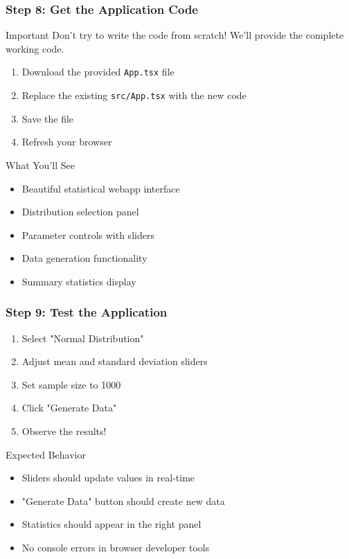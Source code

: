 \documentclass[aspectratio=169]{beamer}
\begin{document}
\begin{frame}
\frametitle{Step 8: Get the Application Code}
\begin{alertblock}{Important}
Don't try to write the code from scratch! We'll provide the complete working code.
\end{alertblock}

\begin{enumerate}
\item Download the provided \texttt{App.tsx} file
\item Replace the existing \texttt{src/App.tsx} with the new code
\item Save the file
\item Refresh your browser
\end{enumerate}

\begin{exampleblock}{What You'll See}
\begin{itemize}
\item Beautiful statistical webapp interface
\item Distribution selection panel
\item Parameter controls with sliders
\item Data generation functionality
\item Summary statistics display
\end{itemize}
\end{exampleblock}
\end{frame}

\begin{frame}[fragile]
\frametitle{Step 9: Test the Application}
\begin{enumerate}
\item Select "Normal Distribution"
\item Adjust mean and standard deviation sliders
\item Set sample size to 1000
\item Click "Generate Data"
\item Observe the results!
\end{enumerate}

\begin{alertblock}{Expected Behavior}
\begin{itemize}
\item Sliders should update values in real-time
\item "Generate Data" button should create new data
\item Statistics should appear in the right panel
\item No console errors in browser developer tools
\end{itemize}
\end{alertblock}
\end{frame}
\end{document}
